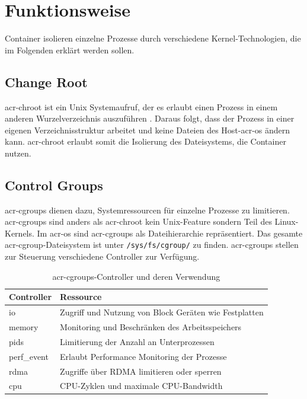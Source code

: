 \section{Funktionsweise}
\label{sec:funktionsweise}

Container isolieren einzelne Prozesse durch verschiedene Kernel-Technologien, die im Folgenden erklärt werden sollen.
\subsection{Change Root}
\label{sec:chroot}
\Gls{acr-chroot} ist ein Unix Systemaufruf, der es erlaubt einen Prozess in einem anderen Wurzelverzeichnis auszuführen \citep{Chroot1LinuxManualPage}. Daraus folgt, dass der Prozess in einer eigenen Verzeichnisstruktur arbeitet und keine Dateien des Host-\gls{acr-os} ändern kann. \Gls{acr-chroot} erlaubt somit die Isolierung des Dateisystems, die Container nutzen.

\subsection{Control Groups}
\label{sec:cgroups}
\Glspl{acr-cgroup} dienen dazu, Systemressourcen für einzelne Prozesse zu limitieren. \Glspl{acr-cgroup} sind anders als \gls{acr-chroot} kein Unix-Feature sondern Teil des Linux-Kernels. Im \gls{acr-os} sind \glspl{acr-cgroup} als Dateihierarchie repräsentiert. Das gesamte \gls{acr-cgroup}-Dateisystem ist unter \texttt{/sys/fs/cgroup/} zu finden. \Glspl{acr-cgroup} stellen zur Steuerung verschiedene Controller zur Verfügung.

\begin{table}[H]
	\begin{center}
		\begin{tabular}{ll}
			\toprule
			Controller 	& Ressource 												\\
			\midrule
			io			& Zugriff und Nutzung von Block Geräten wie Festplatten		\\
			memory		& Monitoring und Beschränken des Arbeitsspeichers 			\\
			pids		& Limitierung der Anzahl an Unterprozessen					\\
			perf\_event	& Erlaubt Performance Monitoring der Prozesse				\\
			rdma		& Zugriffe über RDMA limitieren oder sperren				\\
			cpu			& CPU-Zyklen und maximale CPU-Bandwidth						\\
			\bottomrule
		\end{tabular}
		\caption{\Glspl{acr-cgroup}-Controller und deren Verwendung \citep{Cgroups7LinuxManualPage}}
		\label{tab:cgroupController}
	\end{center}
\end{table}

